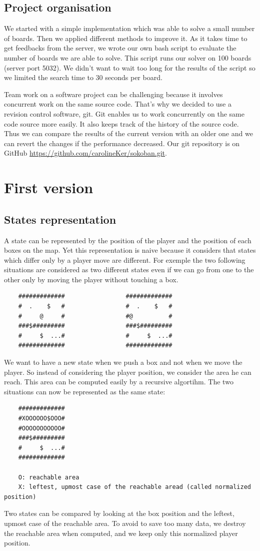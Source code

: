 \documentclass[a4paper,10pt]{article}
\begin{document}
    
    \subsection{Project organisation}
	We started with a simple implementation which was able to solve a small number of boards. 
	Then we applied different methods to improve it.
	As it takes time to get feedbacks from the server, we wrote our own bash script to evaluate the number of boards we are able to solve.
	This script runs our solver on 100 boards (server port 5032).
	We didn't want to wait too long for the results of the script so we limited the search time to 30 seconds per board.

	Team work on a software project can be challenging because it involves concurrent work on the same source code. 
	That's why we decided to use a revision control software, git. 
	Git enables us to work concurrently on the same code source more easily.
	It also keeps track of the history of the source code.
	Thus we can compare the results of the current version with an older one
	and we can revert the changes if the performance decreased.
	Our git repository is on GitHub \url{https://github.com/carolineKer/sokoban.git}.

\section{First version}
	\subsection{States representation}
	A state can be represented by the position of the player and the position of each boxes on the map. 
	Yet this representation is naive because it considers that states which differ only by a player move are different.
	For exemple the two following situations are considered as two different states even if we can go from one to the other only by moving the 
	player without touching a box.
	\begin{verbatim}
	#############                 #############
	#  .    $   #                 #  .    $   #
	#     @     #                 #@          #
	###$#########                 ###$#########
	#     $  ...#                 #     $  ...#
	#############                 #############
	\end{verbatim}
	

	We want to have a new state when we push a box and not when we move the player.
	So instead of considering the player position, we consider the area he can reach.
	This area can be computed easily by a recursive algortihm.
	The two situations can now be represented as the same state:
	\begin{verbatim}
	#############
	#XOOOOOO$OOO#
	#OOOOOOOOOOO#
	###$#########
	#     $  ...#
	#############

	O: reachable area
	X: leftest, upmost case of the reachable aread (called normalized position)
	\end{verbatim}
	Two states can be compared by looking at the box position and the leftest, upmost case of the reachable area.
	To avoid to save too many data, we destroy the reachable area when computed, and we keep only this normalized player position.
\end{document}
